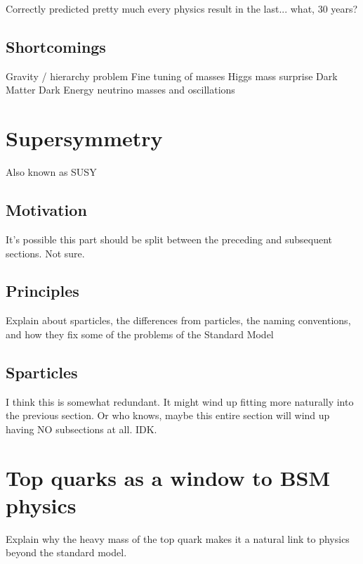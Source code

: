Correctly predicted pretty much every physics result in the last... what, 30 years?

\subsection{Shortcomings}
\label{ssec:SMshortcomings}

Gravity / hierarchy problem
Fine tuning of masses
Higgs mass surprise
Dark Matter
Dark Energy
neutrino masses and oscillations

\section{Supersymmetry}
\label{sec:susy}

Also known as SUSY

\subsection{Motivation}
\label{ssec:susymotivation}

It's possible this part should be split between the preceding and
subsequent sections. Not sure.

\subsection{Principles}
\label{ssec:susyprinciples}

Explain about sparticles, the differences from particles,
the naming conventions, and how they fix some of the problems
of the Standard Model

\subsection{Sparticles}
\label{ssec:susysparticles}

I think this is somewhat redundant. It might wind up fitting more
naturally into the previous section. Or who knows, maybe this entire
section will wind up having NO subsections at all. IDK.

\section{Top quarks as a window to BSM physics}
\label{sec:topquarks}

Explain why the heavy mass of the top quark makes it a natural link
to physics beyond the standard model.